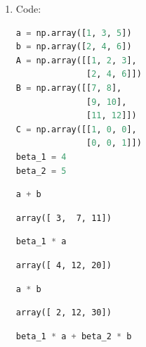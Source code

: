 \documentclass[11pt,letterpaper]{article}
\begin{document}
\begin{enumerate}
\begin{enumerate}
\begin{enumerate}
             $\det(\mathbf{BC}) = \det\left(\begin{bmatrix} 7 & 8 \\ 9 & 10 \\ 11 & 12 \end{bmatrix} \begin{bmatrix} 1 & 0 & 0 \\ 0 & 0 & 1 \end{bmatrix}\right) = \det\left(\begin{bmatrix} 7 & 8 & 0 \\ 9 & 10 & 0 \\ 11 & 12 & 0 \end{bmatrix}\right) = 7 \det\left(\begin{bmatrix} 10 & 0 \\ 12 & 0 \end{bmatrix}\right) - 8 \det\left(\begin{bmatrix} 9 & 0 \\ 11 & 0 \end{bmatrix}\right) + 0 = 7(10 \cdot 0 - 0 \cdot 12) - 8(9 \cdot 0 - 0 \cdot 11) + 0 = 0 - 0 + 0 = 0$
\end{enumerate}
\item Code:
\begin{lstlisting}[language=python]
a = np.array([1, 3, 5])
b = np.array([2, 4, 6])
A = np.array([[1, 2, 3],
              [2, 4, 6]])
B = np.array([[7, 8],
              [9, 10],
              [11, 12]])
C = np.array([[1, 0, 0],
              [0, 0, 1]])
beta_1 = 4
beta_2 = 5
\end{lstlisting}
\begin{lstlisting}[language=python]
a + b
\end{lstlisting}
\begin{verbatim}
array([ 3,  7, 11])
\end{verbatim}
\begin{lstlisting}[language=python]
beta_1 * a
\end{lstlisting}
\begin{verbatim}
array([ 4, 12, 20])
\end{verbatim}
\begin{lstlisting}[language=python]
a * b
\end{lstlisting}
\begin{verbatim}
array([ 2, 12, 30])
\end{verbatim}
\begin{lstlisting}[language=python]
beta_1 * a + beta_2 * b
\end{lstlisting}

\end{enumerate}
\end{enumerate}
\end{document}
